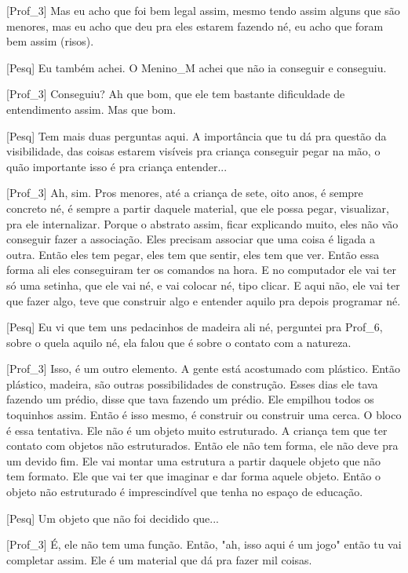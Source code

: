 [Prof\_3] Mas eu acho que foi bem legal assim, mesmo tendo assim alguns que são menores, mas eu acho que deu pra eles estarem fazendo né, eu acho que foram bem assim (risos).

[Pesq] Eu também achei. O Menino\_M achei que não ia conseguir e conseguiu.

[Prof\_3] Conseguiu? Ah que bom, que ele tem bastante dificuldade de entendimento assim. Mas que bom.

[Pesq] Tem mais duas perguntas aqui. A importância que tu dá pra questão da visibilidade, das coisas estarem visíveis pra criança conseguir pegar na mão, o quão importante isso é pra criança entender...

[Prof\_3] Ah, sim. Pros menores, até a criança de sete, oito anos, é sempre concreto né, é sempre a partir daquele material, que ele possa pegar, visualizar, pra ele internalizar. Porque o abstrato assim, ficar explicando muito, eles não vão conseguir fazer a associação. Eles precisam associar que uma coisa é ligada a outra. Então eles tem pegar, eles tem que sentir, eles tem que ver. Então essa forma ali eles conseguiram ter os comandos na hora. E no computador ele vai ter só uma setinha, que ele vai né, e vai colocar né, tipo clicar. E aqui não, ele vai ter que fazer algo, teve que construir algo e entender aquilo pra depois programar né. 

[Pesq] Eu vi que tem uns pedacinhos de madeira ali né, perguntei pra Prof\_6, sobre o quela aquilo né, ela falou que é sobre o contato com a natureza.

[Prof\_3] Isso, é um outro elemento. A gente está acostumado com plástico. Então plástico, madeira, são outras possibilidades de construção. Esses dias ele tava fazendo um prédio, disse que tava fazendo um prédio. Ele empilhou todos os toquinhos assim. Então é isso mesmo, é construir ou construir uma cerca. O bloco é essa tentativa. Ele não é um objeto muito estruturado. A criança tem que ter contato com objetos não estruturados. Então ele não tem forma, ele não deve pra um devido fim. Ele vai montar uma estrutura a partir daquele objeto que não tem formato. Ele que vai ter que imaginar e dar forma aquele objeto. Então o objeto não estruturado é imprescindível que tenha no espaço de educação. 

[Pesq] Um objeto que não foi decidido que...

[Prof\_3] É, ele não tem uma função. Então, "ah, isso aqui é um jogo" então tu vai completar assim. Ele é um material que dá pra fazer mil coisas.

